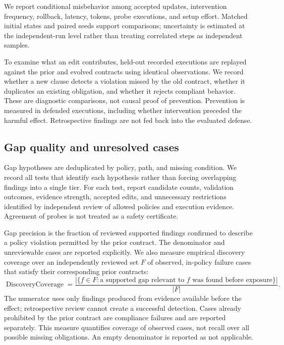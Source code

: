 We report conditional misbehavior among accepted updates, intervention frequency, rollback, latency, tokens, probe executions, and setup effort. Matched initial states and paired seeds support comparisons; uncertainty is estimated at the independent-run level rather than treating correlated steps as independent samples.

To examine what an edit contributes, held-out recorded executions are replayed against the prior and evolved contracts using identical observations. We record whether a new clause detects a violation missed by the old contract, whether it duplicates an existing obligation, and whether it rejects compliant behavior. These are diagnostic comparisons, not causal proof of prevention. Prevention is measured in defended executions, including whether intervention preceded the harmful effect. Retrospective findings are not fed back into the evaluated defense.

\subsection{Gap quality and unresolved cases}
Gap hypotheses are deduplicated by policy, path, and missing condition. We record all tests that identify each hypothesis rather than forcing overlapping findings into a single tier. For each test, report candidate counts, validation outcomes, evidence strength, accepted edits, and unnecessary restrictions identified by independent review of allowed policies and execution evidence. Agreement of probes is not treated as a safety certificate.

Gap precision is the fraction of reviewed supported findings confirmed to describe a policy violation permitted by the prior contract. The denominator and unreviewable cases are reported explicitly. We also measure empirical discovery coverage over an independently reviewed set \(F\) of observed, in-policy failure cases that satisfy their corresponding prior contracts:
\[
 \operatorname{DiscoveryCoverage}
 =\frac{|\{f\in F:\text{a supported gap relevant to }f\text{ was found before exposure}\}|}{|F|}.
\]
The numerator uses only findings produced from evidence available before the effect; retrospective review cannot create a successful detection. Cases already prohibited by the prior contract are compliance failures and are reported separately. This measure quantifies coverage of observed cases, not recall over all possible missing obligations. An empty denominator is reported as not applicable.

